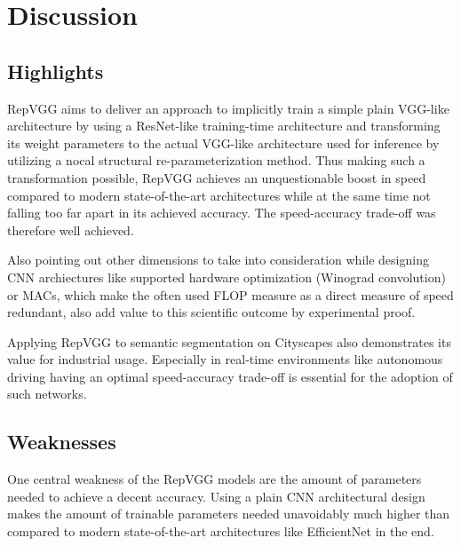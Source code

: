 \section{Discussion} \label{discussion}

\subsection{Highlights}

RepVGG aims to deliver an approach to implicitly train a simple plain VGG-like architecture by using a ResNet-like training-time architecture and transforming its weight parameters to the actual VGG-like architecture used for inference by utilizing a nocal structural re-parameterization method. Thus making such a transformation possible, RepVGG achieves an unquestionable boost in speed compared to modern state-of-the-art architectures while at the same time not falling too far apart in its achieved accuracy. The speed-accuracy trade-off was therefore well achieved. 

Also pointing out other dimensions to take into consideration while designing CNN archiectures like supported hardware optimization (Winograd convolution) or MACs, which make the often used FLOP measure as a direct measure of speed redundant, also add value to this scientific outcome by experimental proof.

Applying RepVGG to semantic segmentation on Cityscapes \cite{MariusCordts.2016} also demonstrates its value for industrial usage. Especially in real-time environments like autonomous driving having an optimal speed-accuracy trade-off is essential for the adoption of such networks. 

\subsection{Weaknesses}

One central weakness of the RepVGG models are the amount of parameters needed to achieve a decent accuracy. Using a plain CNN architectural design makes the amount of trainable parameters needed unavoidably much higher than compared to modern state-of-the-art architectures like EfficientNet in the end.  

